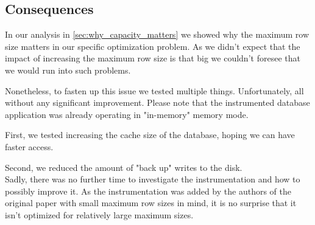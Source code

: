 \subsection{Consequences}
In our analysis in \cref{sec:why_capacity_matters} we showed why the maximum row size matters in our specific optimization problem. As we didn't expect that the impact of increasing the maximum row size is that big we couldn't foresee that we would run into such problems.

Nonetheless, to fasten up this issue we tested multiple things. Unfortunately, all without any significant improvement. Please note that the instrumented database application was already operating in "in-memory" memory mode.

First, we tested increasing the cache size of the database, hoping we can have faster access.

Second, we reduced the amount of "back up" writes to the disk.\\
Sadly, there was no further time to investigate the instrumentation and how to possibly improve it. As the instrumentation was added by the authors of the original paper with small maximum row sizes in mind, it is no surprise that it isn't optimized for relatively large maximum sizes.